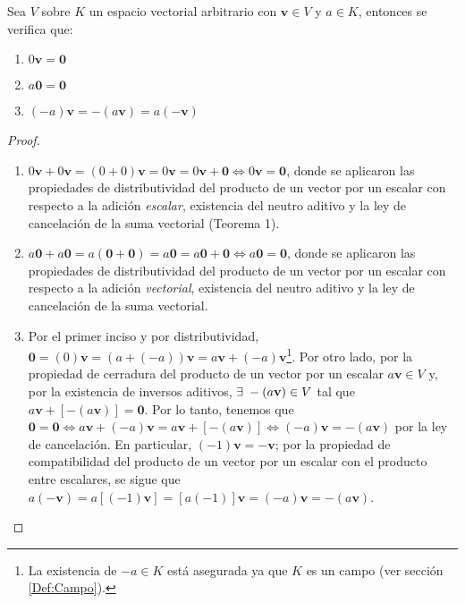 \documentclass[12pt]{article}
\newenvironment{teorema}[2][Teorema]{\begin{trivlist}
\item[\hskip \labelsep {\bfseries #1}\hskip \labelsep {\bfseries #2.}]}{\end{trivlist}}
\begin{document}
\begin{teorema} 2
Sea $V$ sobre $K$ un espacio vectorial arbitrario con $\mathbf{v}\in V$ y $a\in K$, entonces se verifica que:

\begin{enumerate}
    \item $0\mathbf{v}=\mathbf{0}$
    \item $a\mathbf{0}=\mathbf{0}$
    \item $(-a)\mathbf{v}=-(a\mathbf{v})=a(-\mathbf{v})$
\end{enumerate}

\begin{proof}
\begin{enumerate}
    \item $0\mathbf{v}+0\mathbf{v}=(0+0)\mathbf{v}=0\mathbf{v}=0\mathbf{v}+\mathbf{0}\iff0\mathbf{v}=\mathbf{0}$, donde se aplicaron las propiedades de distributividad del producto de un vector por un escalar con respecto a la adición \emph{escalar}, existencia del neutro aditivo y la ley de cancelación de la suma vectorial (Teorema 1).
    \item $a\mathbf{0}+a\mathbf{0}=a(\mathbf{0}+\mathbf{0})=a\mathbf{0}=a\mathbf{0}+\mathbf{0}\iff a\mathbf{0}=\mathbf{0}$, donde se aplicaron las propiedades de distributividad del producto de un vector por un escalar con respecto a la adición \emph{vectorial}, existencia del neutro aditivo y la ley de cancelación de la suma vectorial.
    \item Por el primer inciso y por distributividad, $\mathbf{0} = (0)\mathbf{v} = (a+(-a))\mathbf{v}=a\mathbf{v}+(-a)\mathbf{v}$\footnote{La existencia de $-a\in K$ está asegurada ya que $K$ es un campo (ver sección \ref{Def:Campo}).}. Por otro lado, por la propiedad de cerradura del producto de un vector por un escalar $a\mathbf{v}\in V$ y, por la existencia de inversos aditivos, $\exists\hspace{1mm}-(a\mathbf{v})\in V$ tal que $a\mathbf{v}+[-(a\mathbf{v})]=\mathbf{0}$. Por lo tanto, tenemos que $\mathbf{0}=\mathbf{0}\iff a\mathbf{v}+(-a)\mathbf{v}=a\mathbf{v}+[-(a\mathbf{v})]\iff (-a)\mathbf{v}=-(a\mathbf{v})$ por la ley de cancelación. En particular, $(-1)\mathbf{v}=-\mathbf{v}$; por la propiedad de compatibilidad del producto de un vector por un escalar con el producto entre escalares, se sigue que $a(-\mathbf{v})=a[(-1)\mathbf{v}]=[a(-1)]\mathbf{v}=(-a)\mathbf{v}=-(a\mathbf{v})$.
\end{enumerate}
\end{proof}
\end{teorema}
\end{document}
